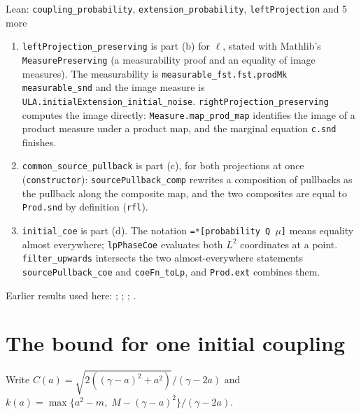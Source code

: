 \documentclass[11pt,a4paper]{article}
\begin{document}
\begin{leanbox}{Lean: \texttt{coupling\_\allowbreak{}probability}, \texttt{extension\_\allowbreak{}probability}, \texttt{leftProjection} and 5 more}
\begin{enumerate}
\item \texttt{left\allowbreak{}Projection\_\allowbreak{}preserving} is part (b) for \(\ell\), stated with Mathlib's \texttt{Measure\allowbreak{}Preserving} (a measurability proof and an equality of image measures). The measurability is \texttt{measurable\_\allowbreak{}fst.\allowbreak{}fst.\allowbreak{}prod\allowbreak{}Mk measurable\_\allowbreak{}snd} and the image measure is \texttt{ULA.\allowbreak{}initial\allowbreak{}Extension\_\allowbreak{}initial\_\allowbreak{}noise}. \texttt{right\allowbreak{}Projection\_\allowbreak{}preserving} computes the image directly: \texttt{Measure.\allowbreak{}map\_\allowbreak{}prod\_\allowbreak{}map} identifies the image of a product measure under a product map, and the marginal equation \texttt{c.\allowbreak{}snd} finishes.

\item \texttt{common\_\allowbreak{}source\_\allowbreak{}pullback} is part (c), for both projections at once (\texttt{constructor}): \texttt{source\allowbreak{}Pullback\_\allowbreak{}comp} rewrites a composition of pullbacks as the pullback along the composite map, and the two composites are equal to \texttt{Prod.\allowbreak{}snd} by definition (\texttt{rfl}).

\item \texttt{initial\_\allowbreak{}coe} is part (d). The notation \texttt{=ᵐ[probability Q \ensuremath{\mu}]} means equality almost everywhere; \texttt{lp\allowbreak{}Phase\allowbreak{}Coe} evaluates both \(L^2\) coordinates at a point. \texttt{filter\_\allowbreak{}upwards} intersects the two almost-everywhere statements \texttt{source\allowbreak{}Pullback\_\allowbreak{}coe} and \texttt{coe\allowbreak{}Fn\_\allowbreak{}to\allowbreak{}Lp}, and \texttt{Prod.\allowbreak{}ext} combines them.

\end{enumerate}
\end{leanbox}


Earlier results used here: \cite[Section~3.17.1]{LangevinLean2026ULASC}; \cite[Section~3.22.2]{LangevinLean2026ULASC}; \cite[Section~3.22.3]{LangevinLean2026ULASC}; \cite[Section~3.22.9]{LangevinLean2026ULASC}.

\section{\texorpdfstring{The bound for one initial coupling}{The bound for one initial coupling}}


Write \(C(a)=\sqrt{2((\gamma-a)^2+a^2)}/(\gamma-2a)\) and \(k(a)=\max\{a^2-m,\;M-(\gamma-a)^2\}/(\gamma-2a)\).
\end{document}
